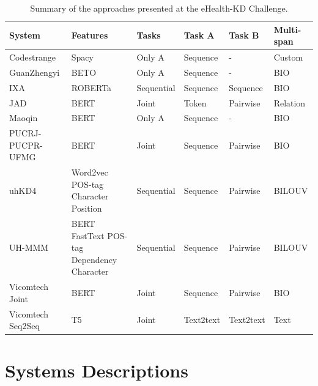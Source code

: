 \documentclass[a4paper,11pt,twocolumn,twoside]{article}
\begin{document}
\begin{table}[htb]
  \centering
  \begin{tabularx}{\textwidth}{lXllll}
    \toprule
    \textbf{System}   & \textbf{Features}                          & \textbf{Tasks} & \textbf{Task A} & \textbf{Task B} & \textbf{Multi-span} \\
    \midrule
    Codestrange       & Spacy                                      & Only A         & Sequence        & -               & Custom              \\
    GuanZhengyi       & BETO                                       & Only A         & Sequence        & -               & BIO                 \\
    IXA               & ROBERTa                                    & Sequential     & Sequence        & Sequence        & BIO                 \\
    JAD               & BERT                                       & Joint          & Token           & Pairwise        & Relation            \\
    Maoqin            & BERT                                       & Only A         & Sequence        & -               & BIO                 \\
    PUCRJ-PUCPR-UFMG  & BERT                                       & Joint          & Sequence        & Pairwise        & BIO                 \\
    uhKD4             & Word2vec POS-tag Character Position        & Sequential     & Sequence        & Pairwise        & BILOUV              \\
    UH-MMM            & BERT FastText POS-tag Dependency Character & Sequential     & Sequence        & Pairwise        & BILOUV              \\
    Vicomtech Joint   & BERT                                       & Joint          & Sequence        & Pairwise        & BIO                 \\
    Vicomtech Seq2Seq & T5                                         & Joint          & Text2text       & Text2text       & Text                \\
    \bottomrule
  \end{tabularx}
  \caption{Summary of the approaches presented at the eHealth-KD Challenge.\label{tab:participants}}
\end{table}

\section{Systems Descriptions}\label{sec:systems}
\end{document}
